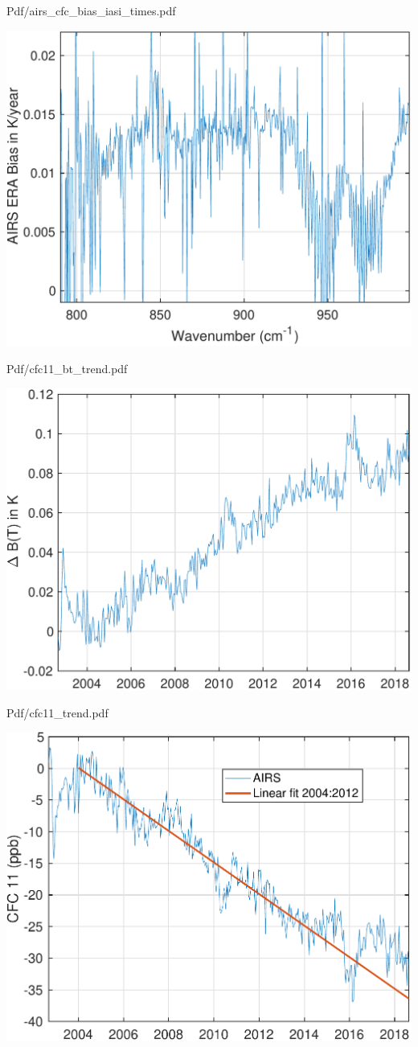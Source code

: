 \documentclass[presentation]{beamer}
\begin{document}
\begin{frame}[label={sec:orgbf7072d}]{Pdf/airs\_cfc\_bias\_iasi\_times.pdf}
\begin{center}
\includegraphics[width=0.7\linewidth]{./Figs/Pdf/airs_cfc_bias_iasi_times.pdf}
\end{center}
\end{frame}

\begin{frame}[label={sec:org7d67f19}]{Pdf/cfc11\_bt\_trend.pdf}
\begin{center}
\includegraphics[width=0.7\linewidth]{./Figs/Pdf/cfc11_bt_trend.pdf}
\end{center}
\end{frame}

\begin{frame}[label={sec:org0843af6}]{Pdf/cfc11\_trend.pdf}
\begin{center}
\includegraphics[width=0.7\linewidth]{./Figs/Pdf/cfc11_trend.pdf}
\end{center}
\end{frame}
\end{document}
